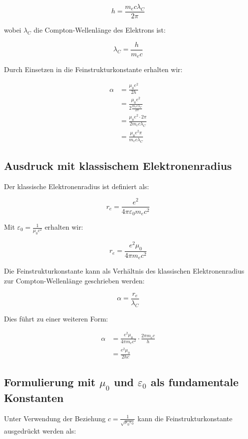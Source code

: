 \documentclass{article}
\begin{document}
	\begin{equation}
		h = \frac{m_e c \lambda_C}{2\pi}
	\end{equation}
	
	wobei $\lambda_C$ die Compton-Wellenlänge des Elektrons ist:
	
	\begin{equation}
		\lambda_C = \frac{h}{m_e c}
	\end{equation}
	
	Durch Einsetzen in die Feinstrukturkonstante erhalten wir:
	
	\begin{align}
		\alpha &= \frac{\mu_0e^2}{2h}\\
		&= \frac{\mu_0e^2}{2\frac{m_e c \lambda_C}{2\pi}}\\
		&= \frac{\mu_0e^2 \cdot 2\pi}{2m_e c \lambda_C}\\
		&= \frac{\mu_0e^2\pi}{m_e c \lambda_C}
	\end{align}
	
	\subsection{Ausdruck mit klassischem Elektronenradius}
	Der klassische Elektronenradius ist definiert als:
	
	\begin{equation}
		r_e = \frac{e^2}{4\pi\varepsilon_0 m_e c^2}
	\end{equation}
	
	Mit $\varepsilon_0 = \frac{1}{\mu_0c^2}$ erhalten wir:
	
	\begin{equation}
		r_e = \frac{e^2\mu_0}{4\pi m_e c^2}
	\end{equation}
	
	Die Feinstrukturkonstante kann als Verhältnis des klassischen Elektronenradius zur Compton-Wellenlänge geschrieben werden:
	
	\begin{equation}
		\alpha = \frac{r_e}{\lambda_C}
	\end{equation}
	
	Dies führt zu einer weiteren Form:
	
	\begin{align}
		\alpha &= \frac{e^2\mu_0}{4\pi m_e c^2} \cdot \frac{2\pi m_e c}{h}\\
		&= \frac{e^2\mu_0}{2hc}
	\end{align}
	
	\subsection{Formulierung mit $\mu_0$ und $\varepsilon_0$ als fundamentale Konstanten}
	Unter Verwendung der Beziehung $c = \frac{1}{\sqrt{\mu_0\varepsilon_0}}$ kann die Feinstrukturkonstante ausgedrückt werden als:
	
\end{document}
